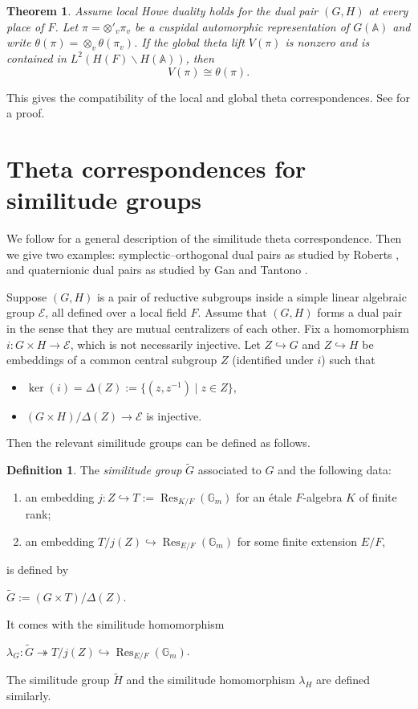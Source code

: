 \documentclass[11pt]{article}
\theoremstyle{plain}
\newtheorem{theorem}{Theorem}[section]
\theoremstyle{remark}
\theoremstyle{definition}
\newtheorem{definition}{Definition}[section]
\DeclareMathOperator{\Res}{Res}
\begin{document}
\begin{theorem}\label{tlgcomp}
Assume local Howe duality holds for the dual pair $(G,H)$ at every place of $F$.
Let $\pi=\otimes'_v\pi_v$ be a cuspidal automorphic representation of $G(\mathbb{A})$ and write $\theta(\pi)=\otimes_v \theta(\pi_v)$.
If the global theta lift $V(\pi)$ is nonzero and is contained in $L^2(H(F)\backslash H(\mathbb{A}))$, then
\[
V(\pi)\cong \theta(\pi).
\]
\end{theorem}
This gives the compatibility of the local and global theta correspondences.
See \cite[Proposition~3.1]{Gan2024} for a proof.

\section{Theta correspondences for similitude groups}\label{slocthetasim}

We follow \cite{BGS2024} for a general description of the similitude theta correspondence.
Then we give two examples: symplectic--orthogonal dual pairs as studied by Roberts \cite{RobertBrooks1996}, and quaternionic dual pairs as studied by Gan and Tantono \cite{GanTan2014}.

Suppose $(G,H)$ is a pair of reductive subgroups inside a simple linear algebraic group $\mathcal{E}$, all defined over a local field $F$.
Assume that $(G,H)$ forms a dual pair in the sense that they are mutual centralizers of each other.
Fix a homomorphism $i\colon G\times H\to\mathcal{E}$, which is not necessarily injective.
Let $Z\hookrightarrow G$ and $Z\hookrightarrow H$ be embeddings of a common central subgroup $Z$ (identified under $i$) such that
\begin{itemize}
    \item $\ker(i)=\Delta(Z):=\{(z,z^{-1})\mid z\in Z\}$,
    \item $(G\times H)/\Delta(Z)\to \mathcal{E}$ is injective.
\end{itemize}
Then the relevant similitude groups can be defined as follows.

\begin{definition}
The \emph{similitude group} $\widetilde{G}$ associated to $G$ and the following data:
\begin{enumerate}
    \item an embedding $j\colon Z\hookrightarrow T:=\Res_{K/F}(\mathbb{G}_m)$ for an \'{e}tale $F$-algebra $K$ of finite rank;
    \item an embedding $T/j(Z)\hookrightarrow \Res_{E/F}(\mathbb{G}_m)$ for some finite extension $E/F$,
\end{enumerate}
is defined by
\begin{center}
    $\widetilde{G}:=(G\times T)/\Delta(Z)$.
\end{center}
It comes with the similitude homomorphism
\begin{center}
    $\lambda_G\colon \widetilde{G}\twoheadrightarrow T/j(Z)\hookrightarrow \Res_{E/F}(\mathbb{G}_m)$.
\end{center}
\end{definition}
\noindent The similitude group $\widetilde{H}$ and the similitude homomorphism $\lambda_{H}$ are defined similarly.
\end{document}
